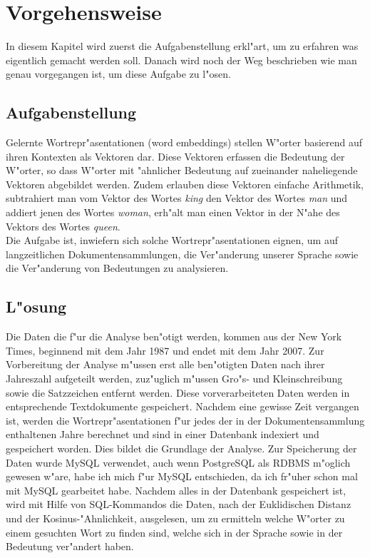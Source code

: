 \chapter{Vorgehensweise}
In diesem Kapitel wird zuerst die Aufgabenstellung erkl"art, um zu erfahren was eigentlich gemacht werden soll. Danach wird noch der Weg beschrieben wie man genau vorgegangen ist, um diese Aufgabe zu l"osen.

\section{Aufgabenstellung}
Gelernte Wortrepr"asentationen (word embeddings) stellen W"orter basierend auf ihren Kontexten als Vektoren dar. Diese Vektoren erfassen die Bedeutung der W"orter, so dass W"orter mit "ahnlicher Bedeutung auf zueinander naheliegende Vektoren abgebildet werden. Zudem erlauben diese Vektoren einfache Arithmetik, subtrahiert man vom Vektor des Wortes \textit{king} den Vektor des Wortes \textit{man} und addiert jenen des Wortes \textit{woman}, erh"alt man einen Vektor in der N"ahe des Vektors des Wortes \textit{queen}.\\
Die Aufgabe ist, inwiefern sich solche Wortrepr"asentationen eignen, um auf langzeitlichen Dokumentensammlungen, die Ver"anderung unserer Sprache sowie die Ver"anderung von Bedeutungen zu analysieren.

\section{L"osung}
Die Daten die f"ur die Analyse ben"otigt werden, kommen aus der New York Times, beginnend mit dem Jahr 1987 und endet mit dem Jahr 2007.
Zur Vorbereitung der Analyse m"ussen erst alle ben"otigten Daten nach ihrer Jahreszahl aufgeteilt werden, zuz"uglich m"ussen Gro"s- und Kleinschreibung sowie die Satzzeichen entfernt werden. Diese vorverarbeiteten Daten werden in entsprechende Textdokumente gespeichert. Nachdem eine gewisse Zeit vergangen ist, werden die Wortrepr"asentationen f"ur jedes der in der Dokumentensammlung enthaltenen Jahre berechnet und sind in einer Datenbank indexiert und gespeichert worden. Dies bildet die Grundlage der Analyse.
Zur Speicherung der Daten wurde MySQL verwendet, auch wenn PostgreSQL als \acs{RDBMS} m"oglich gewesen w"are, habe ich mich f"ur MySQL entschieden, da ich fr"uher schon mal mit MySQL gearbeitet habe.
Nachdem alles in der Datenbank gespeichert ist, wird mit Hilfe von SQL-Kommandos die Daten, nach der Euklidischen Distanz und der Kosinus-"Ahnlichkeit, ausgelesen, um zu ermitteln welche W"orter zu einem gesuchten Wort zu finden sind, welche sich in der Sprache sowie in der Bedeutung ver"andert haben.
